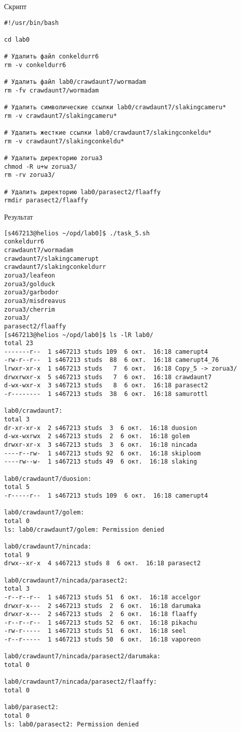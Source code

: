 Скрипт
\begin{verbatim}
#!/usr/bin/bash

cd lab0

# Удалить файл conkeldurr6
rm -v conkeldurr6

# Удалить файл lab0/crawdaunt7/wormadam
rm -fv crawdaunt7/wormadam

# Удалить символические ссылки lab0/crawdaunt7/slakingcameru*
rm -v crawdaunt7/slakingcameru*

# Удалить жесткие ссылки lab0/crawdaunt7/slakingconkeldu*
rm -v crawdaunt7/slakingconkeldu*

# Удалить директорию zorua3
chmod -R u+w zorua3/
rm -rv zorua3/

# Удалить директорию lab0/parasect2/flaaffy
rmdir parasect2/flaaffy
\end{verbatim}

Результат
\begin{verbatim}
[s467213@helios ~/opd/lab0]$ ./task_5.sh
conkeldurr6
crawdaunt7/wormadam
crawdaunt7/slakingcamerupt
crawdaunt7/slakingconkeldurr
zorua3/leafeon
zorua3/golduck
zorua3/garbodor
zorua3/misdreavus
zorua3/cherrim
zorua3/
parasect2/flaaffy
[s467213@helios ~/opd/lab0]$ ls -lR lab0/
total 23
-------r--  1 s467213 studs 109  6 окт.  16:18 camerupt4
-rw-r--r--  1 s467213 studs  88  6 окт.  16:18 camerupt4_76
lrwxr-xr-x  1 s467213 studs   7  6 окт.  16:18 Copy_5 -> zorua3/
drwxrwxr-x  5 s467213 studs   7  6 окт.  16:18 crawdaunt7
d-wx-wxr-x  3 s467213 studs   8  6 окт.  16:18 parasect2
-r--------  1 s467213 studs  38  6 окт.  16:18 samurottl

lab0/crawdaunt7:
total 3
dr-xr-xr-x  2 s467213 studs  3  6 окт.  16:18 duosion
d-wx-wxrwx  2 s467213 studs  2  6 окт.  16:18 golem
drwxr-xr-x  3 s467213 studs  3  6 окт.  16:18 nincada
----r--rw-  1 s467213 studs 92  6 окт.  16:18 skiploom
----rw--w-  1 s467213 studs 49  6 окт.  16:18 slaking

lab0/crawdaunt7/duosion:
total 5
-r-----r--  1 s467213 studs 109  6 окт.  16:18 camerupt4

lab0/crawdaunt7/golem:
total 0
ls: lab0/crawdaunt7/golem: Permission denied

lab0/crawdaunt7/nincada:
total 9
drwx--xr-x  4 s467213 studs 8  6 окт.  16:18 parasect2

lab0/crawdaunt7/nincada/parasect2:
total 3
-r--r--r--  1 s467213 studs 51  6 окт.  16:18 accelgor
drwxr-x---  2 s467213 studs  2  6 окт.  16:18 darumaka
drwxr-x---  2 s467213 studs  2  6 окт.  16:18 flaaffy
-r--r--r--  1 s467213 studs 52  6 окт.  16:18 pikachu
-rw-r-----  1 s467213 studs 51  6 окт.  16:18 seel
-r--r-----  1 s467213 studs 50  6 окт.  16:18 vaporeon

lab0/crawdaunt7/nincada/parasect2/darumaka:
total 0

lab0/crawdaunt7/nincada/parasect2/flaaffy:
total 0

lab0/parasect2:
total 0
ls: lab0/parasect2: Permission denied
\end{verbatim}